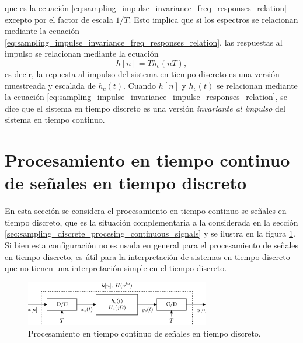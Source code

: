 \documentclass[a4paper]{report}
\begin{document}
que es la ecuación \ref{eq:sampling_impulse_invariance_freq_responses_relation} excepto por el factor de escala \(1/T\). Esto implica que si los espectros se relacionan mediante la ecuación \ref{eq:sampling_impulse_invariance_freq_responses_relation}, las respuestas al impulso se relacionan mediante la ecuación 
\begin{equation}\label{eq:sampling_impulse_invariance_impulse_responses_relation}
 h[n]=Th_c(nT),
\end{equation}
es decir, la repuesta al impulso del sistema en tiempo discreto es una versión muestreada y escalada de \(h_c(t)\). Cuando \(h[n]\) y \(h_c(t)\) se relacionan mediante la ecuación \ref{eq:sampling_impulse_invariance_impulse_responses_relation}, se dice que el sistema en tiempo discreto es una versión \emph{invariante al impulso} del sistema en tiempo continuo.

\section{Procesamiento en tiempo continuo de señales en tiempo discreto}\label{sec:sampling_continuous_procesing_discrete_signals}

En esta sección se considera el procesamiento en tiempo continuo se señales en tiempo discreto, que es la situación complementaria a la considerada en la sección \ref{sec:sampling_discrete_procesing_continuous_signals} y se ilustra en la figura \ref{fig:sampling_continuous_processing_discrete_signal_block_diagram}. Si bien esta configuración no es usada en general para el procesamiento de señales en tiempo discreto, es útil para la interpretación de sistemas en tiempo discreto que no tienen una interpretación simple en el tiempo discreto.
\begin{figure}[!htb]
 \begin{center}
 \includegraphics[width=0.72\textwidth]{figuras/sampling_continuous_processing_discrete_signal_block_diagram.pdf}
 \caption{\label{fig:sampling_continuous_processing_discrete_signal_block_diagram} Procesamiento en tiempo continuo de señales en tiempo discreto.}
 \end{center}
\end{figure} 
\end{document}
